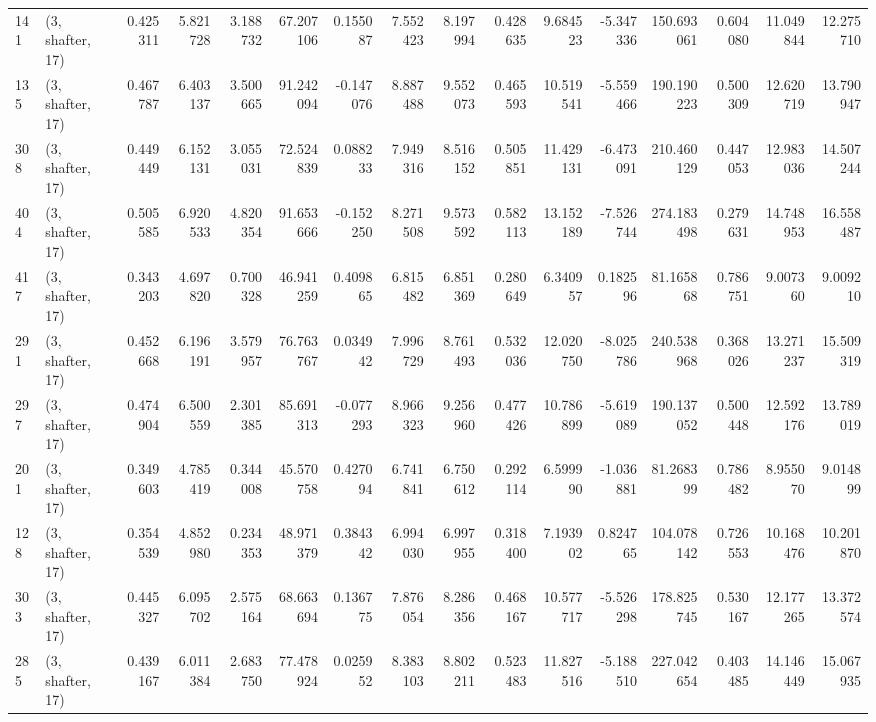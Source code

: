 \begin{tabular}{llrrrrrrrrrrrrrr}
141 &  (3, shafter, 17) &   0.425311 &   5.821728 &   3.188732 &    67.207106 &   0.155087 &   7.552423 &   8.197994 &  0.428635 &   9.684523 &  -5.347336 &   150.693061 &  0.604080 &  11.049844 &  12.275710 \\
135 &  (3, shafter, 17) &   0.467787 &   6.403137 &   3.500665 &    91.242094 &  -0.147076 &   8.887488 &   9.552073 &  0.465593 &  10.519541 &  -5.559466 &   190.190223 &  0.500309 &  12.620719 &  13.790947 \\
308 &  (3, shafter, 17) &   0.449449 &   6.152131 &   3.055031 &    72.524839 &   0.088233 &   7.949316 &   8.516152 &  0.505851 &  11.429131 &  -6.473091 &   210.460129 &  0.447053 &  12.983036 &  14.507244 \\
404 &  (3, shafter, 17) &   0.505585 &   6.920533 &   4.820354 &    91.653666 &  -0.152250 &   8.271508 &   9.573592 &  0.582113 &  13.152189 &  -7.526744 &   274.183498 &  0.279631 &  14.748953 &  16.558487 \\
417 &  (3, shafter, 17) &   0.343203 &   4.697820 &   0.700328 &    46.941259 &   0.409865 &   6.815482 &   6.851369 &  0.280649 &   6.340957 &   0.182596 &    81.165868 &  0.786751 &   9.007360 &   9.009210 \\
291 &  (3, shafter, 17) &   0.452668 &   6.196191 &   3.579957 &    76.763767 &   0.034942 &   7.996729 &   8.761493 &  0.532036 &  12.020750 &  -8.025786 &   240.538968 &  0.368026 &  13.271237 &  15.509319 \\
297 &  (3, shafter, 17) &   0.474904 &   6.500559 &   2.301385 &    85.691313 &  -0.077293 &   8.966323 &   9.256960 &  0.477426 &  10.786899 &  -5.619089 &   190.137052 &  0.500448 &  12.592176 &  13.789019 \\
201 &  (3, shafter, 17) &   0.349603 &   4.785419 &   0.344008 &    45.570758 &   0.427094 &   6.741841 &   6.750612 &  0.292114 &   6.599990 &  -1.036881 &    81.268399 &  0.786482 &   8.955070 &   9.014899 \\
128 &  (3, shafter, 17) &   0.354539 &   4.852980 &   0.234353 &    48.971379 &   0.384342 &   6.994030 &   6.997955 &  0.318400 &   7.193902 &   0.824765 &   104.078142 &  0.726553 &  10.168476 &  10.201870 \\
303 &  (3, shafter, 17) &   0.445327 &   6.095702 &   2.575164 &    68.663694 &   0.136775 &   7.876054 &   8.286356 &  0.468167 &  10.577717 &  -5.526298 &   178.825745 &  0.530167 &  12.177265 &  13.372574 \\
285 &  (3, shafter, 17) &   0.439167 &   6.011384 &   2.683750 &    77.478924 &   0.025952 &   8.383103 &   8.802211 &  0.523483 &  11.827516 &  -5.188510 &   227.042654 &  0.403485 &  14.146449 &  15.067935 \\

\end{tabular}
